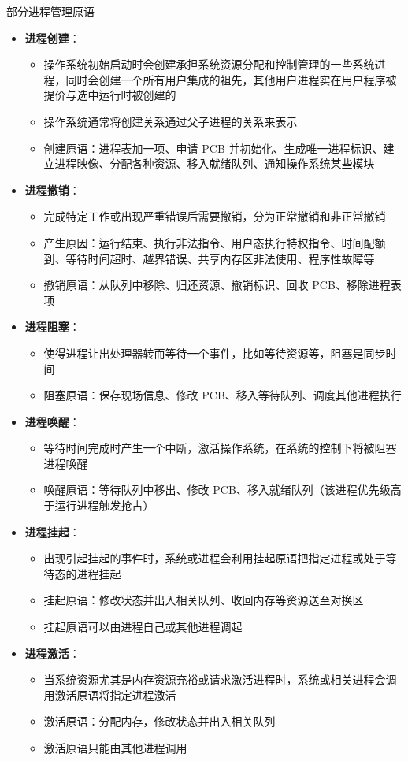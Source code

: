 \documentclass[cs4size,a4paper,10pt]{ctexart}
\begin{document}
	部分进程管理原语
	\begin{itemize}
		\item \textbf{进程创建}：
		\begin{itemize}
			\item 操作系统初始启动时会创建承担系统资源分配和控制管理的一些系统进程，同时会创建一个所有用户集成的祖先，其他用户进程实在用户程序被提价与选中运行时被创建的
			\item 操作系统通常将创建关系通过父子进程的关系来表示
			\item 创建原语：进程表加一项、申请 PCB 并初始化、生成唯一进程标识、建立进程映像、分配各种资源、移入就绪队列、通知操作系统某些模块
		\end{itemize}
		\item \textbf{进程撤销}：
		\begin{itemize}
			\item 完成特定工作或出现严重错误后需要撤销，分为正常撤销和非正常撤销
			\item 产生原因：运行结束、执行非法指令、用户态执行特权指令、时间配额到、等待时间超时、越界错误、共享内存区非法使用、程序性故障等
			\item 撤销原语：从队列中移除、归还资源、撤销标识、回收 PCB、移除进程表项
		\end{itemize}
		\item \textbf{进程阻塞}：
		\begin{itemize}
			\item 使得进程让出处理器转而等待一个事件，比如等待资源等，阻塞是同步时间
			\item 阻塞原语：保存现场信息、修改 PCB、移入等待队列、调度其他进程执行
		\end{itemize}
		\item \textbf{进程唤醒}：
		\begin{itemize}
			\item 等待时间完成时产生一个中断，激活操作系统，在系统的控制下将被阻塞进程唤醒
			\item 唤醒原语：等待队列中移出、修改 PCB、移入就绪队列（该进程优先级高于运行进程触发抢占）
		\end{itemize}
		\item \textbf{进程挂起}：
		\begin{itemize}
			\item 出现引起挂起的事件时，系统或进程会利用挂起原语把指定进程或处于等待态的进程挂起
			\item 挂起原语：修改状态并出入相关队列、收回内存等资源送至对换区
			\item 挂起原语可以由进程自己或其他进程调起
		\end{itemize}
		\item\textbf{进程激活}：
		\begin{itemize}
			\item 当系统资源尤其是内存资源充裕或请求激活进程时，系统或相关进程会调用激活原语将指定进程激活
			\item 激活原语：分配内存，修改状态并出入相关队列
			\item 激活原语只能由其他进程调用
		\end{itemize}
	\end{itemize}
\end{document}
